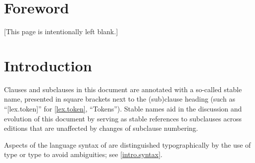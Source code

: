 
\chapter{Foreword}

[This page is intentionally left blank.]

\chapter{Introduction}

Clauses and subclauses in this document are annotated
with a so-called stable name,
presented in square brackets next to the (sub)clause heading
(such as ``[lex.token]'' for \ref{lex.token}, ``Tokens'').
Stable names aid in the discussion and evolution of this document
by serving as stable references to subclauses across editions
that are unaffected by changes of subclause numbering.

Aspects of the language syntax of \Cpp{} are distinguished typographically
by the use of  type
or  type to avoid ambiguities; see \ref{intro.syntax}.
